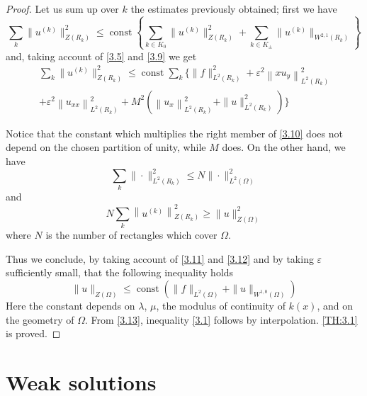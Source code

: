 \documentclass[a4paper,12pt,leqno]{article}
\numberwithin{equation}{section}
\begin{document}
\begin{proof}
Let us sum up over $k$ the estimates previously obtained; first we have
\begin{equation*}
	\sum_{k} \|u^{(k)}\|_{Z(R_k)}^2
	\leqslant \operatorname{const}
	\left\{
	\sum_{k \in K_0} \|u^{(k)}\|_{Z(R_k)}^2 + 
	\sum_{k \in K_\pm} \|u^{(k)}\|_{W^{2,1}(R_k)}
	\right\}
\end{equation*}
and, taking account of \eqref{3.5} and \eqref{3.9} we get
\begin{equation} \label{3.10}
	\begin{split}
		\sum_{k} \|u^{(k)}\|_{Z(R_k)}^2 \leqslant
		\operatorname{const} \sum_{k} \Bigg\{
		\|f\|_{L^{2}\left(R_{k}\right)}^2
		+\varepsilon^2\left\|x u_{y}\right\|_{L^{2}\left(R_{k}\right)}^2 \\
		+\varepsilon^2\left\|u_{x x}\right\|_{L^{2}\left(R_{k}\right)}^2
		+M^2\left(\left\|u_{x}\right\|_{L^{2}\left(R_{k}\right)}^2+\|u\|_{L^{2}\left(R_{k}\right)}^2\right) \Bigg\}
	\end{split}
\end{equation}

\newpage

Notice that the constant which multiplies the right member of \eqref{3.10} does not depend on the chosen partition of unity, while $M$ does. On the other hand, we have
\begin{equation} \label{3.11}
	\sum_{k}\|\cdot\|_{L^{2}\left(R_{k}\right)}^2 \leqslant N \|\cdot \|_{L^{2}(\Omega)}^{2}
\end{equation}
and
\begin{equation} \label{3.12}
	N \sum_{k}\left\|u^{(k)}\right\|_{Z\left(R_{k}\right)}^{2} \geqslant\|u\|_{Z(\Omega)}^{2}
\end{equation}
where $N$ is the number of rectangles which cover $\Omega$.

Thus we conclude, by taking account of \eqref{3.11} and \eqref{3.12} and by taking $\varepsilon$ sufficiently small, that the following inequality holds
\begin{equation} \label{3.13}
	\|u\|_{Z(\Omega)} \leqslant \operatorname{const}\left(\|f\|_{L^{2}(\Omega)}+\|u\|_{W^{1,0} (\Omega)}\right)
\end{equation}
Here the constant depends on $\lambda$, $\mu$, the modulus of continuity of $k(x)$, and on the geometry of $\Omega$. From \eqref{3.13}, inequality \eqref{3.1} follows by interpolation. \cref{TH:3.1} is proved.
\end{proof}

\section{Weak solutions} \label{S4}
\end{document}
